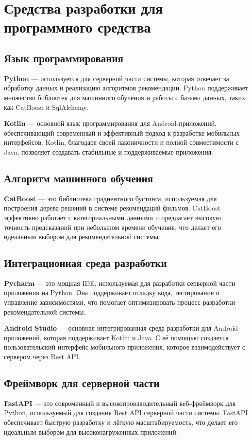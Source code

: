 \section{Средства разработки для программного средства}

\subsection{Язык программирования}
\textbf{Python} — используется для серверной части системы, которая отвечает за обработку данных и реализацию алгоритмов рекомендации. Python поддерживает множество библиотек для машинного обучения и работы с базами данных, таких как CatBoost и SqlAlchemy.

\textbf{Kotlin} — основной язык программирования для Android-приложений, обеспечивающий современный и эффективный подход к разработке мобильных интерфейсов. Kotlin, благодаря своей лаконичности и полной совместимости с Java, позволяет создавать стабильные и поддерживаемые приложения.

\subsection{Алгоритм машинного обучения}
\textbf{CatBoost} — это библиотека градиентного бустинга, используемая для построения дерева решений в системе рекомендаций фильмов. CatBoost эффективно работает с категориальными данными и предлагает высокую точность предсказаний при небольшом времени обучения, что делает его идеальным выбором для рекомендательной системы.

\subsection{Интеграционная среда разработки}
\textbf{Pycharm} — это мощная IDE, используемая для разработки серверной части приложения на Python. Она поддерживает отладку кода, тестирование и управление зависимостями, что помогает оптимизировать процесс разработки рекомендательной системы.

\textbf{Android Studio} — основная интегрированная среда разработки для Android-приложений, которая поддерживает Kotlin и Java. С её помощью создается пользовательский интерфейс мобильного приложения, которое взаимодействует с сервером через Rest API.

\subsection{Фреймворк для серверной части}
\textbf{FastAPI} — это современный и высокопроизводительный веб-фреймворк для Python, используемый для создания Rest API серверной части системы. FastAPI обеспечивает быструю разработку и лёгкую масштабируемость, что делает его идеальным выбором для высоконагруженных приложений.

